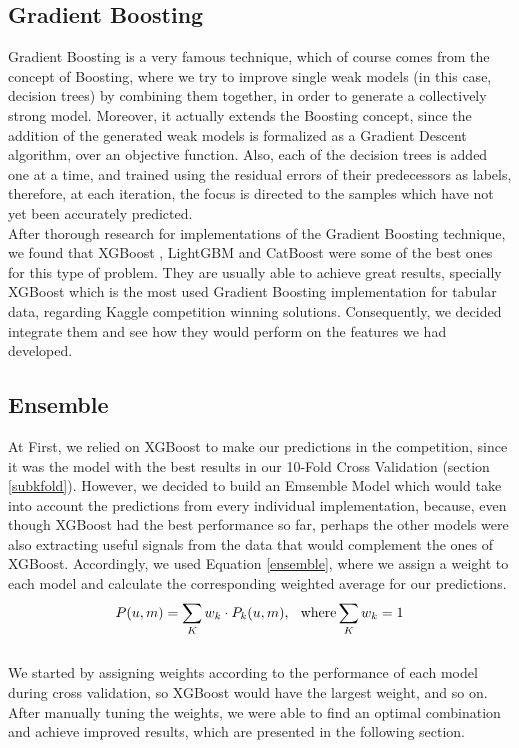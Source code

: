 \documentclass{article}
\begin{document}
\subsection{Gradient Boosting}\label{boosting_section}

Gradient Boosting is a very famous technique, which of course comes from the concept of Boosting, where we try to improve single weak models (in this case, decision trees) by combining them together, in order to generate a collectively strong model. Moreover, it actually extends the Boosting concept, since the addition of the generated weak models is formalized as a Gradient Descent algorithm, over an objective function. Also, each of the decision trees is added one at a time, and trained using the residual errors of their predecessors as labels, therefore, at each iteration, the focus is directed to the samples which have not yet been accurately predicted.\\
After thorough research for implementations of the Gradient Boosting technique, we found that XGBoost \cite{xgboost}, LightGBM \cite{lightgbm} and CatBoost \cite{catboost} were some of the best ones for this type of problem. They are usually able to achieve great results, specially XGBoost which is the most used Gradient Boosting implementation for tabular data, regarding Kaggle competition winning solutions. Consequently, we decided integrate them and see how they would perform on the features we had developed.

\subsection{Ensemble} \label{ensemble_section}

At First, we relied on XGBoost \cite{xgboost} to make our predictions in the competition, since it was the model with the best results in our 10-Fold Cross Validation (section \ref{subkfold}). However, we decided to build an Emsemble Model which would take into account the predictions from every individual implementation, because, even though XGBoost had the best performance so far, perhaps the other models were also extracting useful signals from the data that would complement the ones of XGBoost. Accordingly, we used Equation \ref{ensemble}, where we assign a weight to each model and calculate the corresponding weighted average for our predictions.\\
\begin{align} \label{ensemble}
    P(u, m) = \sum_K w_k \cdot P_k(u, m)\textrm{, \> where} \sum_K w_k = 1
\end{align}\\
We started by assigning weights according to the performance of each model during cross validation, so XGBoost would have the largest weight, and so on. After manually tuning the weights, we were able to find an optimal combination and achieve improved results, which are presented in the following section.
\end{document}
